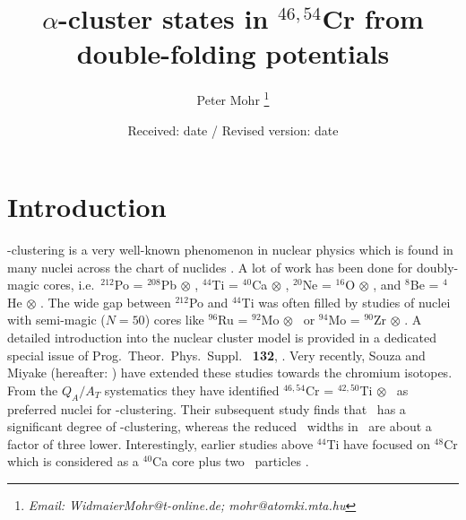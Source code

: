 %
\title{
$\alpha$-cluster states in $^{46,54}$Cr from double-folding potentials
}
%
%
\author{Peter Mohr%
\thanks{\emph{Email: WidmaierMohr@t-online.de; mohr@atomki.mta.hu}} %
}                     %
%
%
%
\date{Received: date / Revised version: date}
%
%
\maketitle
%
\section{Introduction}
\label{sec:intro}
%
\al -clustering is a very well-known phenomenon in nuclear physics which is
found in many nuclei across the chart of nuclides \cite{Hor12}. A lot of work
has been done for doubly-magic cores, i.e.\ $^{212}$Po = $^{208}$Pb $\otimes$
\al , $^{44}$Ti = $^{40}$Ca $\otimes$ \al , $^{20}$Ne = $^{16}$O $\otimes$ \al
, and $^{8}$Be = $^{4}$He $\otimes$ \al . The wide gap between $^{212}$Po and
$^{44}$Ti was often filled by studies of nuclei with semi-magic ($N =50$)
cores like $^{96}$Ru = $^{92}$Mo $\otimes$ \al\ or $^{94}$Mo = $^{90}$Zr
$\otimes$ \al . A detailed introduction into the nuclear cluster model is
provided in a dedicated special issue of Prog.\ Theor.\ Phys.\ Suppl.\ {\bf
  132}, \cite{Ohk98,Mic98,Yam98,Sak98,Ueg98,Has98,Koh98,Toh98}.  Very
recently, Souza and Miyake \cite{Sou17} (hereafter: \SM ) have extended these
studies towards the chromium isotopes. From the $Q_A/A_T$ systematics they
have identified $^{46,54}$Cr = $^{42,50}$Ti $\otimes$ \al\ as preferred nuclei
for \al -clustering. Their subsequent study finds that \crvi\ has a
significant degree of \al -clustering, whereas the reduced \al\ widths in
\criv\ are about a factor of three lower. Interestingly, earlier studies above
$^{44}$Ti have focused on $^{48}$Cr which is considered as a $^{40}$Ca core
plus two \al\ particles \cite{Des02,Sak02}.

